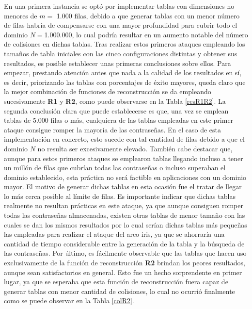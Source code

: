 \documentclass[12pt,spanish,listoffigures,listoftables,listofalgorithms]{tfgetsinf}
\begin{document}
En una primera instancia se optó por implementar tablas con dimensiones no menores de $m =$ 1.000 filas, debido a que generar tablas con un menor número de filas habría de compensarse con una mayor profundidad para cubrir todo el dominio $N = $1.000.000, lo cual podría resultar en un aumento notable del número de colisiones en dichas tablas. Tras realizar estos primeros ataques empleando los tamaños de tabla iniciales con las cinco configuraciones distintas y obtener sus resultados, es posible establecer unas primeras conclusiones sobre ellos. Para empezar, prestando atención antes que nada a la calidad de los resultados en sí, es decir, priorizando las tablas con porcentajes de éxito mayores, queda claro que la mejor combinación de funciones de reconstrucción se da empleando sucesivamente \textbf{R1} y \textbf{R2}, como puede observarse en la Tabla \ref{resR1R2}. La segunda conclusión clara que puede establecerse es que, una vez se emplean tablas de 5.000 filas o más, cualquiera de las tablas empleadas en este primer ataque consigue romper la mayoría de las contraseñas. En el caso de esta implementación en concreto, esto sucede con tal cantidad de filas debido a que el dominio $N$ no resulta ser excesivamente elevado. También cabe destacar que, aunque para estos primeros ataques se emplearon tablas llegando incluso a tener un millón de filas que cubrían todas las contraseñas o incluso superaban el dominio establecido, esta práctica no será factible en aplicaciones con un dominio mayor. El motivo de generar dichas tablas en esta ocasión fue el tratar de llegar lo más cerca posible al límite de filas. Es importante indicar que dichas tablas realmente no resultan prácticas en este ataque, ya que aunque consiguen romper todas las contraseñas almacenadas, existen otras tablas de menor tamaño con las cuales se dan los mismos resultados por lo cual serían dichas tablas más pequeñas las empleadas para realizar el ataque del arco iris, ya que se ahorraría una cantidad de tiempo considerable entre la generación de la tabla y la búsqueda de las contraseñas. Por último, es fácilmente observable que las tablas que hacen uso exclusivamente de la función de reconstrucción \textbf{R2} brindan los peores resultados, aunque sean satisfactorios en general. Esto fue un hecho sorprendente en primer lugar, ya que se esperaba que esta función de reconstrucción fuera capaz de generar tablas con menor cantidad de colisiones, lo cual no ocurrió finalmente como se puede observar en la Tabla \ref{colR2}.
\end{document}
